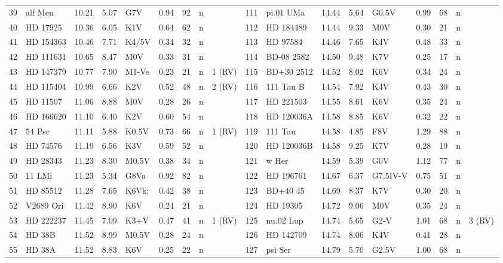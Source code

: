 \begin{landscape}
\begin{longtable}{r l r r l r r c l @{\;\vrule\;} r l r r l r r c l}
39 & alf Men & 10.21 & 5.07 & G7V & 0.94 & 92 & n &  & 111 & pi.01 UMa & 14.44 & 5.64 & G0.5V & 0.99 & 68 & n &  \\
40 & HD 17925 & 10.36 & 6.05 & K1V & 0.64 & 62 & n &  & 112 & HD 184489 & 14.44 & 9.33 & M0V & 0.30 & 21 & n &  \\
41 & HD 154363 & 10.46 & 7.71 & K4/5V & 0.34 & 32 & n &  & 113 & HD 97584 & 14.46 & 7.65 & K4V & 0.48 & 33 & n &  \\
42 & HD 111631 & 10.65 & 8.47 & M0V & 0.33 & 31 & n &  & 114 & BD-08 2582 & 14.50 & 9.48 & K7V & 0.25 & 17 & n &  \\
43 & HD 147379 & 10.77 & 7.90 & M1-Ve & 0.23 & 21 & n & 1 (RV) & 115 & BD+30 2512 & 14.52 & 8.02 & K6V & 0.34 & 24 & n &  \\
44 & HD 115404 & 10.99 & 6.66 & K2V & 0.52 & 48 & n & 2 (RV) & 116 & 111 Tau B & 14.54 & 7.92 & K4V & 0.43 & 30 & n &  \\
45 & HD 11507 & 11.06 & 8.88 & M0V & 0.28 & 26 & n &  & 117 & HD 221503 & 14.55 & 8.61 & K6V & 0.35 & 24 & n &  \\
46 & HD 166620 & 11.10 & 6.40 & K2V & 0.60 & 54 & n &  & 118 & HD 120036A & 14.58 & 8.85 & K6V & 0.32 & 22 & n &  \\
47 & 54 Psc & 11.11 & 5.88 & K0.5V & 0.73 & 66 & n & 1 (RV) & 119 & 111 Tau & 14.58 & 4.85 & F8V & 1.29 & 88 & n &  \\
48 & HD 74576 & 11.19 & 6.56 & K3V & 0.59 & 52 & n &  & 120 & HD 120036B & 14.58 & 9.25 & K7V & 0.28 & 19 & n &  \\
49 & HD 28343 & 11.23 & 8.30 & M0.5V & 0.38 & 34 & n &  & 121 & w Her & 14.59 & 5.39 & G0V & 1.12 & 77 & n &  \\
50 & 11 LMi & 11.23 & 5.34 & G8Va & 0.92 & 82 & n &  & 122 & HD 196761 & 14.67 & 6.37 & G7.5IV-V & 0.75 & 51 & n &  \\
51 & HD 85512 & 11.28 & 7.65 & K6Vk: & 0.42 & 38 & n &  & 123 & BD+40 45 & 14.69 & 8.37 & K7V & 0.30 & 20 & n &  \\
52 & V2689 Ori & 11.42 & 8.90 & K6V & 0.24 & 21 & n &  & 124 & HD 19305 & 14.72 & 9.06 & M0V & 0.35 & 24 & n &  \\
53 & HD 222237 & 11.45 & 7.09 & K3+V & 0.47 & 41 & n & 1 (RV) & 125 & nu.02 Lup & 14.74 & 5.65 & G2-V & 1.01 & 68 & n & 3 (RV) \\
54 & HD 38B & 11.52 & 8.99 & M0.5V & 0.28 & 24 & n &  & 126 & HD 142709 & 14.74 & 8.06 & K4V & 0.41 & 28 & n &  \\
55 & HD 38A & 11.52 & 8.83 & K6V & 0.25 & 22 & n &  & 127 & psi Ser & 14.79 & 5.70 & G2.5V & 1.00 & 68 & n &  \\

\end{longtable}
\end{landscape}
